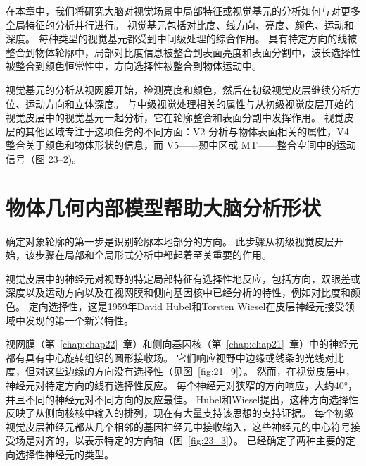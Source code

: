 在本章中，我们将研究大脑对视觉场景中局部特征或视觉基元的分析如何与对更多全局特征的分析并行进行。
视觉基元包括对比度、线方向、亮度、颜色、运动和深度。
每种类型的视觉基元都受到中间级处理的综合作用。
具有特定方向的线被整合到物体轮廓中，局部对比度信息被整合到表面亮度和表面分割中，波长选择性被整合到颜色恒常性中，方向选择性被整合到物体运动中。


视觉基元的分析从视网膜开始，检测亮度和颜色，然后在初级视觉皮层继续分析方位、运动方向和立体深度。
与中级视觉处理相关的属性与从初级视觉皮层开始的视觉皮层中的视觉基元一起分析，它在轮廓整合和表面分割中发挥作用。
视觉皮层的其他区域专注于这项任务的不同方面：V2 分析与物体表面相关的属性，V4 整合关于颜色和物体形状的信息，而 V5——颞中区或 MT——整合空间中的运动信号（图 23–2)。



\section{物体几何内部模型帮助大脑分析形状}

确定对象轮廓的第一步是识别轮廓本地部分的方向。
此步骤从初级视觉皮层开始，该步骤在局部和全局形式分析中都起着至关重要的作用。


视觉皮层中的神经元对视野的特定局部特征有选择性地反应，包括方向，双眼差或深度以及运动方向以及在视网膜和侧向基因核中已经分析的特性，例如对比度和颜色。 
定向选择性，这是1959年David Hubel和Torsten Wiesel在皮层神经元接受领域中发现的第一个新兴特性。


视网膜（第~\ref{chap:chap22}~章）和侧向基因核（第~\ref{chap:chap21}~章）中的神经元都有具有中心旋转组织的圆形接收场。
它们响应视野中边缘或线条的光线对比度，但对这些边缘的方向没有选择性（见图~\ref{fig:21_9}）。
然而，在视觉皮层中，神经元对特定方向的线有选择性反应。
每个神经元对狭窄的方向响应，大约40°，并且不同的神经元对不同方向的反应最佳。
Hubel和Wiesel提出，这种方向选择性反映了从侧向核核中输入的排列，现在有大量支持该思想的支持证据。
每个初级视觉皮层神经元都从几个相邻的基因神经元中接收输入，这些神经元的中心符号接受场是对齐的，以表示特定的方向轴（图~\ref{fig:23_3}）。
已经确定了两种主要的定向选择性神经元的类型。


